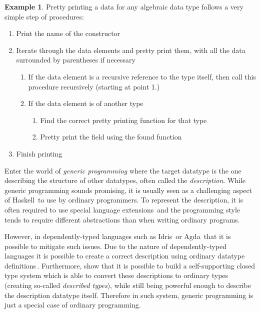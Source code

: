 \documentclass{ituthesis}
\theoremstyle{definition}
\newtheorem{exmp}{Example}
\begin{document}
\begin{exmp}
  Pretty printing a data for any algebraic data type follows a very simple step of procedures:
  \begin{enumerate}
    \item Print the name of the constructor
    \item Iterate through the data elements and pretty print them, with all the data surrounded by parentheses if necessary
    \begin{enumerate}
      \item If the data element is a recursive reference to the type itself, then call this procedure recursively (starting at point 1.)
      \item If the data element is of another type
      \begin{enumerate}
        \item Find the correct pretty printing function for that type
        \item Pretty print the field using the found function
      \end{enumerate}
    \end{enumerate}
    \item Finish printing
  \end{enumerate}
  \label{exmp:prettyprint}
\end{exmp}

Enter the world of \textit{generic programming} where the target datatype is the one describing the structure of other datatypes, often called the \textit{description}.
While generic programming sounds promising, it is usually seen as a challenging aspect of Haskell\,\cite[]{haskell98} to use by ordinary programmers. To represent the description, it is often required to use special language extensions\,\cite[]{magalhaes2010generic} and the programming style tends to require different abstractions than when writing ordinary programs.

However, in dependently-typed languages such as Idris\,\cite[]{brady2013idris} or Agda\,\cite[]{norell2009dependently} that it is possible to mitigate such issues.
Due to the nature of dependently-typed languages it is possible to create a correct description using ordinary datatype definitions\,\cite[]{benke2003universes}.
Furthermore, \cite{Chapman:2010:GAL:1863543.1863547} show that it is possible to build a self-supporting closed type system which is able to convert these descriptions to ordinary types (creating so-called \textit{described types}), while still being powerful enough to describe the description datatype itself.
Therefore in such system, generic programming is just a special case of ordinary programming.
\end{document}
